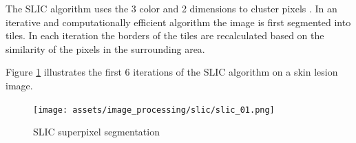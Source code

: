 The SLIC algorithm uses the 3 color and 2 dimensions to cluster pixels \cite{slic}. In an iterative and computationally efficient algorithm the image is first segmented into tiles. In each iteration the borders of the tiles are recalculated based on the similarity of the pixels in the surrounding area.

Figure \ref{fig:slic} illustrates the first 6 iterations of the SLIC algorithm on a skin lesion image.


\begin{figure}[H]
    \texttt{[image: assets/image\_processing/slic/slic\_01.png]}
    \caption{SLIC superpixel segmentation}
    \label{fig:slic}
\end{figure}



